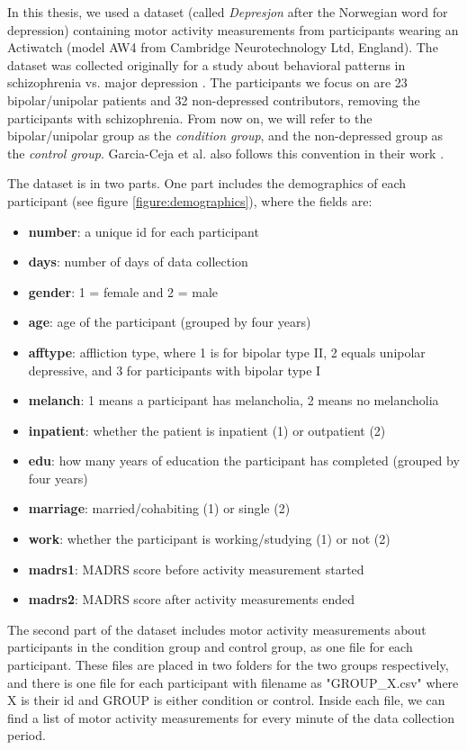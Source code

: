 In this thesis, we used a dataset (called \textit{Depresjon} after the Norwegian word for depression) containing motor activity measurements from participants wearing an Actiwatch (model AW4 from Cambridge Neurotechnology Ltd, England). The dataset was collected originally for a study about behavioral patterns in schizophrenia vs. major depression \cite{Berle2010}. The participants we focus on are 23 bipolar/unipolar patients and 32 non-depressed contributors, removing the participants with schizophrenia. From now on, we will refer to the bipolar/unipolar group as the \textit{condition group}, and the non-depressed group as the \textit{control group}. Garcia-Ceja et al. also follows this convention in their work \cite{GarciaCeja2018_classification_bipolar}.

The dataset is in two parts. One part includes the demographics of each participant (see figure \ref{figure:demographics}), where the fields are:

\begin{itemize}
    \item \textbf{number}: a unique id for each participant
    \item \textbf{days}: number of days of data collection 
    \item \textbf{gender}: 1 = female and 2 = male
    \item \textbf{age}: age of the participant (grouped by four years)
    \item \textbf{afftype}: affliction type, where 1 is for bipolar type II, 2 equals unipolar depressive, and 3 for participants with bipolar type I
    \item \textbf{melanch}: 1 means a participant has melancholia, 2 means no melancholia
    \item \textbf{inpatient}: whether the patient is inpatient (1) or outpatient (2)
    \item \textbf{edu}: how many years of education the participant has completed (grouped by four years)
    \item \textbf{marriage}: married/cohabiting (1) or single (2)
    \item \textbf{work}: whether the participant is working/studying (1) or not (2)
    \item \textbf{madrs1}: MADRS score before activity measurement started
    \item \textbf{madrs2}: MADRS score after activity measurements ended
\end{itemize}

The second part of the dataset includes motor activity measurements about participants in the condition group and control group, as one file for each participant. These files are placed in two folders for the two groups respectively, and there is one file for each participant with filename as "GROUP\_X.csv" where X is their id and GROUP is either condition or control. Inside each file, we can find a list of motor activity measurements for every minute of the data collection period.

